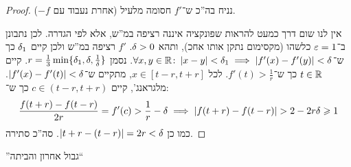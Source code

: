 \documentclass[name=רשימות חשבון דיפרנציאלי ואינטגרלי 1א]{../../../tex/classes/megasumPreamble}
\begin{document}
	\begin{proof}
		נניח בה''כ ש־$f'$ חסומה מלעיל (אחרת נעבוד עם $-f$).

		אין לנו שום דרך כמעט להראות שפונקציה איננה רציפה במ''ש, אלא לפי הגדרה. לכן נתבונן ב־$\eg = 1$ כלשהו (מקסימום נתקן אותו אחכ), ותהא $\delta > 0$. $f'$ רציפה במ''ש ולכן קיים $\delta_1$ כך ש־$\forall x, y \in \mathbb{R} \colon \left \lvert x - y \right \rvert < \delta_1 \implies \left \lvert f'(x)- f'(y) \right \rvert < \delta$. נסמן $r = \frac{1}{3}\min\{\delta_1, \delta, \frac{1}{\delta}\}$. קיים $t \in \mathbb{R}$ כך ש־$f'(t) > \frac{1}{r}$. לכל $x \in [t - r, t + r]$, מתקיים ש־$\left \lvert f'(x) - f'(t) \right \rvert < \delta$. מלגראנג', קיים $c \in (t - r, t + r)$ כך ש־:
		\[ \frac{f(t + r) - f(t - r)}{2r} = f'(c) > \frac{1}{r} - \delta \implies \left \lvert f(t + r) - f(t - r) \right \rvert > 2 - 2 r \delta \geqslant 1 \]
		כמו כן $\left \lvert t + r - (t - r) \right \rvert  = 2r < \delta$. סה''כ סתירה.
	\end{proof}

	''גבול אחרון והביתה``
\end{document}
